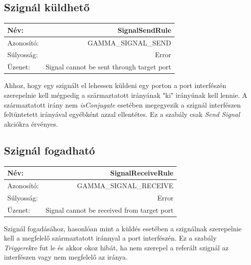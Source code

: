 \subsection{Szignál küldhető}

\begin{tabular}{ | l | r | }
	\hline
	Név: & SignalSendRule  \\ 
	\hline
	Azonosító: & GAMMA\_SIGNAL\_SEND \\
	\hline
	Súlyosság: & Error \\  
	\hline
	Üzenet: & Signal cannot be sent through target port \\
	\hline
\end{tabular}\newline
\newline
Ahhoz, hogy egy szignált el lehessen küldeni egy porton a port interfészén szerepelnie kell mégpedig a származtatott irányának "ki" irányúnak kell lennie. A származtatott irány nem \emph{isConjugate} esetében megegyezik a szignál interfészen feltüntetett irányával egyébként azzal ellentétes. Ez a szabály csak \emph{Send Signal} akciókra érvényes.

\subsection{Szignál fogadható}

\begin{tabular}{ | l | r | }
	\hline
	Név: & SignalReceiveRule  \\ 
	\hline
	Azonosító: & GAMMA\_SIGNAL\_RECEIVE \\
	\hline
	Súlyosság: & Error \\  
	\hline
	Üzenet: & Signal cannot be received from target port \\
	\hline
\end{tabular}\newline
\newline
Szignál fogadásához, hasonlóan mint a küldés esetében a szignálnak szerepelnie kell a megfelelő származtatott iránnyal a port interfészén. Ez a szabály \emph{Triggerek}re fut le és akkor okoz hibát, ha nem szerepel a referált szignál az interfészen vagy nem megfelelő az iránya.

